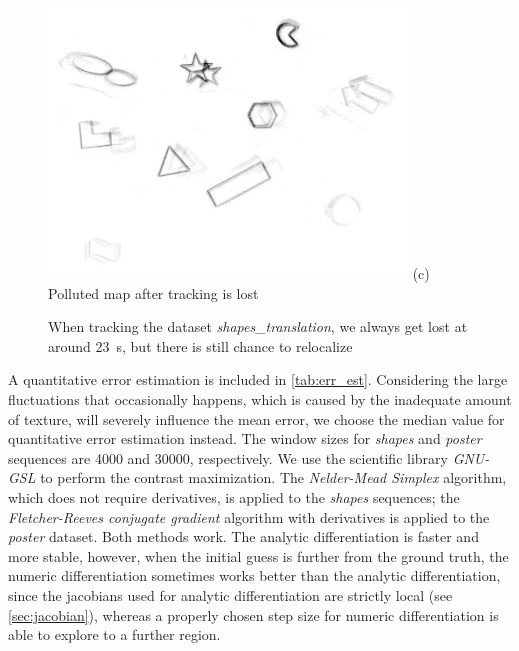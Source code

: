 \begin{enumerate}
\begin{figure}[h]
\begin{minipage}[t]{0.48\textwidth}
        \includegraphics[width = \textwidth]{images/map_956.jpg} (c)
        Polluted map after tracking is lost
      \end{minipage} \caption{When tracking the dataset
        \textit{shapes\_translation}, we always get lost at around
        \SI{23}{\second}, but there is still chance to relocalize}
      \label{fig:shapes_tr_lost}
    \end{figure}

  \end{enumerate}

  A quantitative error estimation is included in
  \cref{tab:err_est}. Considering the large fluctuations that
  occasionally happens, which is caused by the inadequate amount of
  texture, will severely influence the mean error, we choose the
  median value for quantitative error estimation instead. The window
  sizes for \textit{shapes} and \textit{poster} sequences are 4000 and
  30000, respectively. We use the scientific library \emph{GNU-GSL} to
  perform the contrast maximization. The \emph{Nelder-Mead Simplex}
  algorithm, which does not require derivatives, is applied to the
  \textit{shapes} sequences; the \textit{Fletcher-Reeves conjugate
    gradient}\citep{fletcher2013practical} algorithm with derivatives
  is applied to the \textit{poster} dataset. Both methods work. The
  analytic differentiation is faster and more stable, however, when
  the initial guess is further from the ground truth, the numeric
  differentiation sometimes works better than the analytic
  differentiation, since the jacobians used for analytic
  differentiation are strictly local (see \cref{sec:jacobian}),
  whereas a properly chosen step size for numeric differentiation is
  able to explore to a further region.

